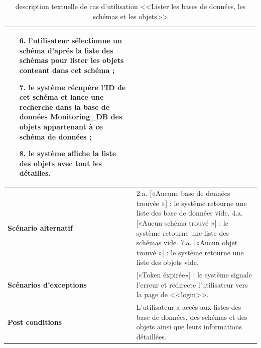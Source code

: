 \begin{enumerate}
\begin{table}[H]
\begin{tabular}{|p{3.5cm}|p{12cm}|}
\begin{enumerate}
                    \item [6.] l'utilisateur sélectionne un schéma d'aprés la liste des schémas pour lister les objets conteant dans cet schéma ;
                    \item [7.] le système récupére l'ID de cet schéma et lance une recherche dans la base de données Monitoring\_DB des objets appartenant à ce schéma de données ;
                    \item [8.] le système affiche la liste des objets avec tout les détailles.
                \end{enumerate}\\
                    \hline \textbf{Scénario alternatif} & 
                    2.a. \hspace{0.3cm} [«Aucune base de données trouvée »] : le système retourne une liste des base de données vide.
                    4.a. \hspace{0.3cm} [«Aucun schéma trouvé »] : le système retourne une liste des schémas vide.
                    7.a. \hspace{0.3cm} [«Aucun objet trouvé »] : le système retourne une liste des objets vide.\\
            \hline  \textbf{Scénarios d'exceptions} & 
              [«Token éxpirée»] : le système signale l'erreur et redirecte l'utilisateur vers la page de <<login>>.\\
            \hline \textbf{Post conditions} & L'utilisateur a accès aux listes des base de données, des schémas et des objets ainsi que leurs informations détaillées.\\
            \hline 
        \end{tabular}
        \caption{description textuelle de cas d'utilisation <<Lister les bases de données, les schémas et les objets>>}
        \end{table}
\end{enumerate}
